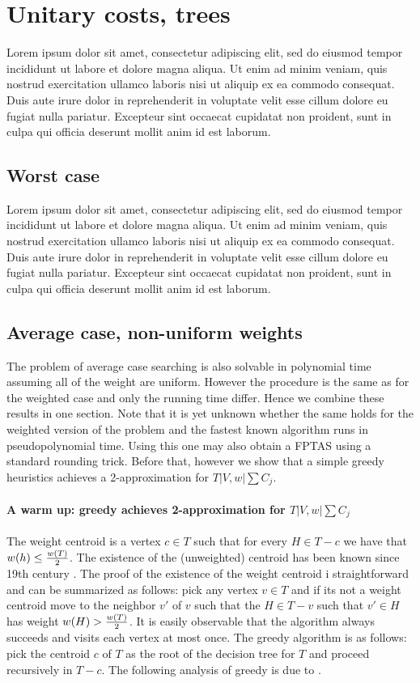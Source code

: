 \section{Unitary costs, trees}
Lorem ipsum dolor sit amet, consectetur adipiscing elit, sed do eiusmod tempor incididunt ut labore et dolore magna aliqua. Ut enim ad minim veniam, quis nostrud exercitation ullamco laboris nisi ut aliquip ex ea commodo consequat. Duis aute irure dolor in reprehenderit in voluptate velit esse cillum dolore eu fugiat nulla pariatur. Excepteur sint occaecat cupidatat non proident, sunt in culpa qui officia deserunt mollit anim id est laborum.
\subsection{Worst case}
Lorem ipsum dolor sit amet, consectetur adipiscing elit, sed do eiusmod tempor incididunt ut labore et dolore magna aliqua. Ut enim ad minim veniam, quis nostrud exercitation ullamco laboris nisi ut aliquip ex ea commodo consequat. Duis aute irure dolor in reprehenderit in voluptate velit esse cillum dolore eu fugiat nulla pariatur. Excepteur sint occaecat cupidatat non proident, sunt in culpa qui officia deserunt mollit anim id est laborum.
\subsection{Average case, non-uniform weights}
The problem of average case searching is also solvable in polynomial time assuming all of the weight are uniform. However the procedure is the same as for the weighted case and only the running time differ. Hence we combine these results in one section. Note that it is yet unknown whether the same holds for the weighted version of the problem and the fastest known algorithm runs in pseudopolynomial time. Using this one may also obtain a FPTAS using a standard rounding trick. Before that, however we show that a simple greedy heuristics achieves a 2-approximation for $T|V,w|\sum C_j$.
\paragraph{A warm up: greedy achieves 2-approximation for $T|V,w|\sum C_j$}
The weight centroid is a vertex $c\in T$ such that for every $H\in T-c$ we have that $w\mathopen{}\left( h \right)\leq \frac{w\mathopen{}\left( T \right)}{2}$. The existence of the (unweighted) centroid has been known since 19th century \cite{Jordan1869}. The proof of the existence of the weight centroid i straightforward and can be summarized as follows: pick any vertex $v\in T$ and if its not a weight centroid move to the neighbor $v'$ of $v$ such that the $H\in T-v$ such that $v'\in H$ has weight $w\mathopen{}\left( H \right)>\frac{w\mathopen{}\left( T \right)}{2}$. It is easily observable that the algorithm always succeeds and visits each vertex at most once. The greedy algorithm is as follows: pick the centroid $c$ of $T$ as the root of the decision tree for $T$ and proceed recursively in $T-c$. The following analysis of greedy is due to \cite{Fast_app_centroid_trees}.

